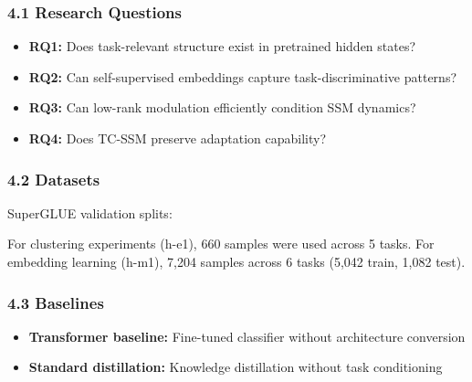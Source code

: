 
\subsubsection{4.1 Research Questions}

\begin{itemize}
\item \textbf{RQ1:} Does task-relevant structure exist in pretrained hidden states?
\item \textbf{RQ2:} Can self-supervised embeddings capture task-discriminative patterns?
\item \textbf{RQ3:} Can low-rank modulation efficiently condition SSM dynamics?
\item \textbf{RQ4:} Does TC-SSM preserve adaptation capability?
\end{itemize}

\subsubsection{4.2 Datasets}

SuperGLUE validation splits:

\begin{table}[htbp]
\centering
{}
\end{table}

For clustering experiments (h-e1), 660 samples were used across 5 tasks. For embedding learning (h-m1), 7,204 samples across 6 tasks (5,042 train, 1,082 test).

\subsubsection{4.3 Baselines}

\begin{itemize}
\item \textbf{Transformer baseline:} Fine-tuned classifier without architecture conversion
\item \textbf{Standard distillation:} Knowledge distillation without task conditioning
\end{itemize}

